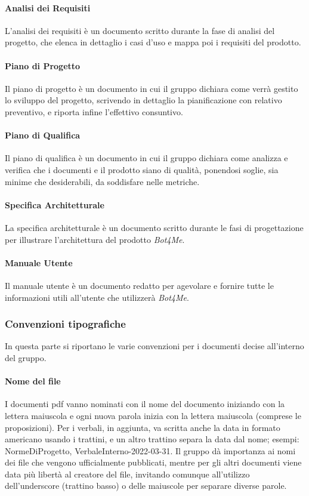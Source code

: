 \paragraph{Analisi dei Requisiti}  \hfill \break
L'analisi dei requisiti è un documento scritto durante la fase di analisi del progetto, che elenca in 
dettaglio i casi d'uso e mappa poi i requisiti del prodotto.

\paragraph{Piano di Progetto}  \hfill \break
Il piano di progetto è un documento in cui il gruppo dichiara come verrà gestito lo sviluppo del progetto,
scrivendo in dettaglio la pianificazione con relativo preventivo, e riporta infine l'effettivo consuntivo.

\paragraph{Piano di Qualifica} \hfill \break
Il piano di qualifica è un documento in cui il gruppo dichiara come analizza e verifica che i documenti e 
il prodotto siano di qualità, ponendosi soglie, sia minime che desiderabili, da soddisfare nelle metriche.

\paragraph{Specifica Architetturale} \hfill \break
La specifica architetturale è un documento scritto durante le fasi di progettazione per illustrare 
l'architettura del prodotto \emph{Bot4Me}.

\paragraph{Manuale Utente} \hfill \break
Il manuale utente è un documento redatto per agevolare e fornire tutte le informazioni utili all'utente che 
utilizzerà \emph{Bot4Me}.

\subsubsection{Convenzioni tipografiche} 
In questa parte si riportano le varie convenzioni per i documenti decise all'interno del gruppo.
\paragraph{Nome del file}  \hfill \break
I documenti pdf vanno nominati con il nome del documento iniziando con la lettera maiuscola 
e ogni nuova parola inizia con la lettera maiuscola (comprese le proposizioni). Per i verbali, in 
aggiunta, va scritta anche la data in formato americano usando i trattini, e un altro trattino separa la data 
dal nome; esempi: NormeDiProgetto, VerbaleInterno-2022-03-31. \newline
Il gruppo dà importanza ai nomi dei file che vengono ufficialmente pubblicati, mentre per gli 
altri documenti viene data più libertà al creatore del file, invitando comunque all'utilizzo 
dell'underscore (trattino basso) o delle maiuscole per separare diverse parole.

